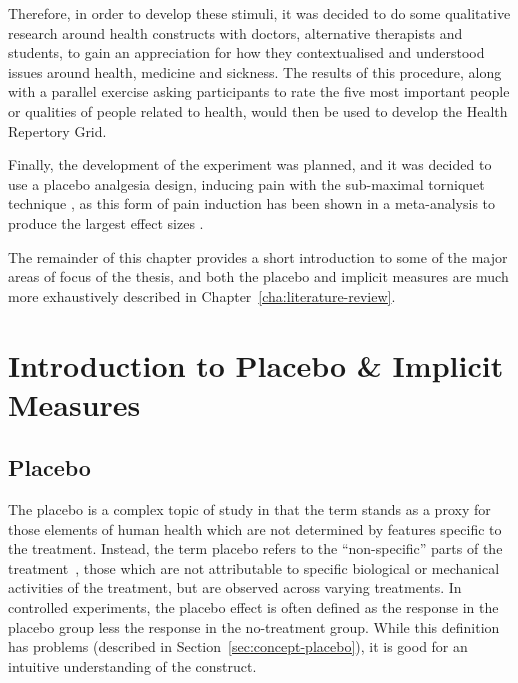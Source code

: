 Therefore, in order to develop these stimuli, it was decided to do
some qualitative research around health constructs with doctors,
alternative therapists and students, to gain an appreciation for how
they contextualised and understood issues around health, medicine and
sickness. The results of this procedure, along with a parallel
exercise asking participants to rate the five most important people or
qualities of people related to health, would then be used to develop
the Health Repertory Grid.

Finally, the development of the experiment was planned, and it was
decided to use a placebo analgesia design, inducing pain with the
sub-maximal torniquet technique \cite{moore1979submaximal}, as this
form of pain induction has been shown in a meta-analysis to produce
the largest effect sizes \cite{Sauro2005}.











The remainder of this chapter provides a short introduction to some of the major areas of focus of the thesis, and both the placebo and implicit measures are much more exhaustively described in Chapter~\ref{cha:literature-review}. 


\section{Introduction to Placebo \& Implicit Measures}
\label{sec:intr-plac-impl-meas}

\subsection{Placebo}
\label{sec:placebo}

The placebo is a complex topic of study in that the term stands as a proxy for those elements of human health which are not determined by  features specific to the treatment. Instead, the term placebo refers to the ``non-specific'' parts of the treatment~\cite{grunbaum1981placebo}, those which are not attributable to  specific biological or mechanical activities of the treatment, but are observed across varying treatments. In controlled experiments, the placebo effect is often defined as the response in the placebo group less the response in the no-treatment group. While this definition has problems (described in Section~\ref{sec:concept-placebo}), it is good for an intuitive understanding of the construct. 

